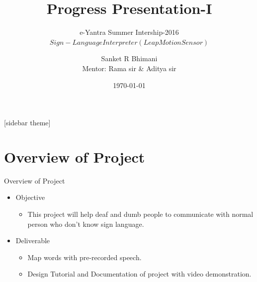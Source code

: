 \documentclass[10pt, a4paper]{beamer}
\begin{document}
	\title{Progress Presentation-I}
	\subtitle{e-Yantra Summer Intership-2016 \\ $Sign-Language Interpreter (Leap Motion Sensor)$}
	\author{Sanket R Bhimani\\
	Mentor: Rama sir \& Aditya sir}
	\date{\today}
	\frame{\titlepage}

[sidebar theme]
\section{Overview of Project}
\begin{frame}{Overview of Project}
\vspace{-45px}
\vspace{15px}
	\begin{itemize}
		\item Objective
		\begin{itemize}
		    \item This project will help deaf and dumb people to communicate with normal person who don't know sign language.
		\end{itemize}
		\item Deliverable
		\begin{itemize}
		    \item Map words with pre-recorded speech.
		    \item Design Tutorial and Documentation of project with video demonstration.
		\end{itemize}
	\end{itemize}
\end{frame}
\end{document}
